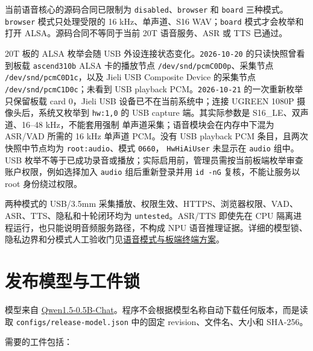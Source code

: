 当前语音核心的源码合同已限制为
\passthrough{\lstinline!disabled!}、\passthrough{\lstinline!browser!} 和
\passthrough{\lstinline!board!}
三种模式。\passthrough{\lstinline!browser!} 模式只处理受限的 16
kHz、单声道、S16 WAV；\passthrough{\lstinline!board!} 模式才会枚举和打开
ALSA。源码合同不等同于当前 20T 语音服务、ASR 或 TTS 已通过。

20T 板的 ALSA 枚举会随 USB
外设连接状态变化。\passthrough{\lstinline!2026-10-20!}
的只读快照曾看到板载 \passthrough{\lstinline!ascend310b!} ALSA
卡的播放节点 \passthrough{\lstinline!/dev/snd/pcmC0D0p!}、采集节点
\passthrough{\lstinline!/dev/snd/pcmC0D1c!}，以及 Jieli USB Composite
Device 的采集节点 \passthrough{\lstinline!/dev/snd/pcmC1D0c!}；未看到
USB playback PCM。\passthrough{\lstinline!2026-10-21!}
的一次重新枚举只保留板载 card 0，Jieli USB 设备已不在当前系统中；连接
UGREEN 1080P 摄像头后，系统又枚举到 \passthrough{\lstinline!hw:1,0!} 的
USB capture 端。其实际参数是 S16\_LE、双声道、16--48 kHz，不能套用强制
单声道采集；语音模块会在内存中下混为 ASR/VAD 所需的 16 kHz 单声道
PCM。没有 USB playback PCM 条目，且两次快照中节点均为
\passthrough{\lstinline!root:audio!}、模式
\passthrough{\lstinline!0660!}， \passthrough{\lstinline!HwHiAiUser!}
未显示在 \passthrough{\lstinline!audio!} 组中。USB
枚举不等于已成功录音或播放；实际启用前，管理员需按当前板端枚举审查账户权限，例如选择加入
\passthrough{\lstinline!audio!} 组后重新登录并用
\passthrough{\lstinline!id -nG!} 复核，不能让服务以 root 身份绕过权限。

两种模式的 USB/3.5mm
采集播放、权限生效、HTTPS、浏览器权限、VAD、ASR、TTS、隐私和十轮闭环均为
\passthrough{\lstinline!untested!}。ASR/TTS 即使先在 CPU
隔离进程运行，也只能说明音频服务路径，不构成 NPU
语音推理证据。详细的模型锁、隐私边界和分模式人工验收门见\href{https://github.com/zhouxzh/Ascend310/blob/main/samples/case9/docs/08-board-voice-terminal-plan.md}{语音模式与板端终端方案}。

\section{发布模型与工件锁}\label{ux53d1ux5e03ux6a21ux578bux4e0eux5de5ux4ef6ux9501}

模型来自
\href{https://huggingface.co/Qwen/Qwen1.5-0.5B-Chat}{Qwen1.5-0.5B-Chat}。程序不会根据模型名称自动下载任何版本，而是读取
\passthrough{\lstinline!configs/release-model.json!} 中的固定
revision、文件名、大小和 SHA-256。

需要的工件包括：

